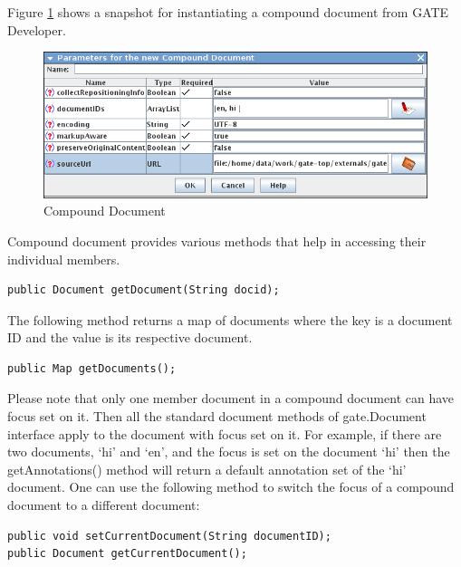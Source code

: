 Figure \ref{fig:compound-document} shows a snapshot for instantiating a compound
document from GATE Developer.

\begin{figure}[ht]
\begin{center}
\includegraphics[width=\textwidth]{compound-document.png}
\caption{Compound Document}
\label{fig:compound-document}
\end{center}
\end{figure}

Compound document provides various methods that help in accessing their 
individual members.

\begin{small}\begin{verbatim}
public Document getDocument(String docid);
\end{verbatim}\end{small}

The following method returns a map of documents where the key is a document ID
and the value is its respective document.

\begin{small}\begin{verbatim}
public Map getDocuments();
\end{verbatim}\end{small}

Please note that only one member document in a compound document can have focus 
set on it.  Then all the standard document methods of gate.Document interface
apply to the document with focus set on it. For example, if there are two 
documents, `hi' and `en', and the focus is set on the document `hi' then the
getAnnotations() method will return a default annotation set of the
`hi' document.  One can use the following method to switch the focus
of a compound document to a different document:

\begin{small}\begin{verbatim}
public void setCurrentDocument(String documentID);
public Document getCurrentDocument();
\end{verbatim}\end{small}

